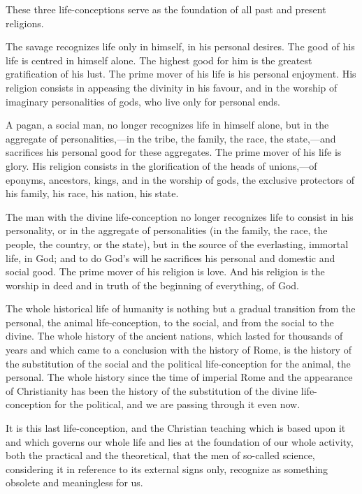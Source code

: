 \documentclass{book}
\begin{document}
These three life-conceptions serve as the foundation of all past and present religions.

The savage recognizes life only in himself, in his personal desires. The good of his life is centred in himself alone. The highest good for him is the greatest gratification of his lust. The prime mover of his life is his personal enjoyment. His religion consists in appeasing the divinity in his favour, and in the worship of imaginary personalities of gods, who live only for personal ends.

A pagan, a social man, no longer recognizes life in himself alone, but in the aggregate of personalities,—in the tribe, the family, the race, the state,—and sacrifices his personal good for these aggregates. The prime mover of his life is glory. His religion consists in the glorification of the heads of unions,—of eponyms, ancestors, kings, and in the worship of gods, the exclusive protectors of his family, his race, his nation, his state.\footnotemark[1]

The man with the divine life-conception no longer recognizes life to consist in his personality, or in the aggregate of personalities (in the family, the race, the people, the country, or the state), but in the source of the everlasting, immortal life, in God; and to do God’s will he sacrifices his personal and domestic and social good. The prime mover of his religion is love. And his religion is the worship in deed and in truth of the beginning of everything, of God.

The whole historical life of humanity is nothing but a gradual transition from the personal, the animal life-conception, to the social, and from the social to the divine. The whole history of the ancient nations, which lasted for thousands of years and which came to a conclusion with the history of Rome, is the history of the substitution of the social and the political life-conception for the animal, the personal. The whole history since the time of imperial Rome and the appearance of Christianity has been the history of the substitution of the divine life-conception for the political, and we are passing through it even now.

It is this last life-conception, and the Christian teaching which is based upon it and which governs our whole life and lies at the foundation of our whole activity, both the practical and the theoretical, that the men of so-called science, considering it in reference to its external signs only, recognize as something obsolete and meaningless for us.
\end{document}
